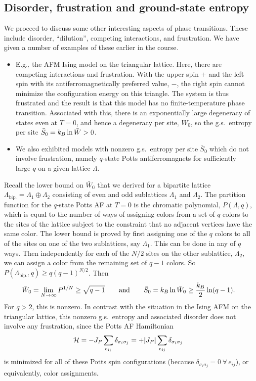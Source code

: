 \subsection{Disorder, frustration and ground-state entropy}

We proceed to discuss some other interesting aspects of phase transitions. These include disorder, ``dilution'',
competing interactions, and frustration. We have given a number of examples of these earlier in the course.
\begin{itemize}
  \item E.g., the AFM Ising model on the triangular lattice. Here, there are competing interactions and frustration. With
    the upper spin $+$ and the left spin with its antiferromagnetically preferred value, $-$, the right spin cannot minimize
    the configuration energy on this triangle. The system is thus frustrated and the result is that this model has no
    finite-temperature phase transition. Associated with this, there is an exponentially large degeneracy of states even at
    $T = 0$, and hence a degeneracy per site, $\bar W_0$, so the g.s.\ entropy per site $\bar S_0 = k_{B}\ln\bar W>0$.
  \item We also exhibited models with nonzero g.s.\ entropy per site $\bar S_0$ which do not involve frustration, namely
    $q$-state Potts antiferromagnets for sufficiently large $q$ on a given lattice $\Lambda$.
\end{itemize}
Recall the lower bound on $\bar W_0$ that we derived for a bipartite lattice $\Lambda_{\text{bip.}} = \Lambda_1\oplus\Lambda_2$
consisting of even and odd sublattices $\Lambda_1$ and $\Lambda_2$. The partition function for the $q$-state Potts AF at
$T = 0$ is the chromatic polynomial, $P(\Lambda,q)$, which is equal to the number of ways of assigning colors from a set of
$q$ colors to the sites of the lattice subject to the constraint that no adjacent vertices have the same color. The lower
bound is proved by first assigning one of the $q$ colors to all of the sites on one of the two sublattices, say $\Lambda_1$.
This can be done in any of $q$ ways. Then independently for each of the $N/2$ sites on the other sublattice,
$\Lambda_2$, we can assign a color from the remaining set of $q-1$ colors. So $P(\Lambda_{\text{bip.}},q)\ge q(q-1)^{N/2}$.
Then
\begin{equation}
  \bar W_0 = \lim_{N\to\infty}P^{1/N}\ge\sqrt{q-1}\qquad\text{and}\qquad \bar S_0 = k_{B}\ln\bar W_0\ge\frac{k_{B}}{2}\ln(q-1).
\end{equation}
For $q>2$, this is nonzero. In contrast with the situation in the Ising AFM on the triangular lattice, this nonzero g.s.\
entropy and associated disorder does not involve any frustration, since the Potts AF Hamiltonian
\begin{equation}
  \mathcal{H} = -J_P\sum_{e_{ij}}\delta_{\sigma_i\sigma_j} = +|J_P|\sum_{e_{ij}}\delta_{\sigma_i\sigma_j}
\end{equation}
is minimized for all of these Potts spin configurations (because $\delta_{\sigma_i\sigma_j} = 0\ \forall\,e_{ij}$), or
equivalently, color assignments.

